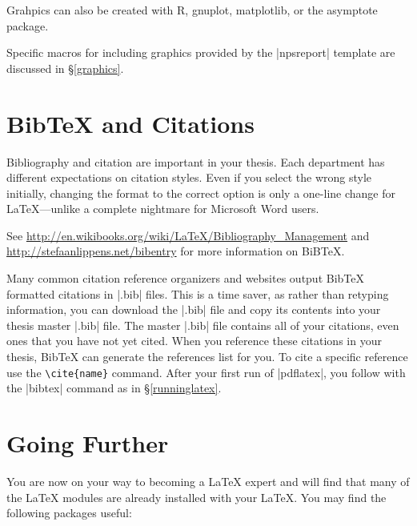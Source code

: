 Grahpics can also be created with R, gnuplot, matplotlib, or the asymptote
package.

Specific macros for including graphics provided by the |npsreport| template are
discussed in \S\ref{graphics}.

\section{Bib\TeX{} and Citations}
Bibliography and citation are important in your thesis.  Each department has different expectations
on citation styles.  Even if you select the wrong style initially, changing the format to the correct
option is only a one-line change for \LaTeX{}---unlike a complete nightmare for Microsoft Word users.

See \url{http://en.wikibooks.org/wiki/LaTeX/Bibliography_Management} and
 \\ \url{http://stefaanlippens.net/bibentry} for more information on BiB\TeX.
 
Many common citation reference organizers and websites output Bib\TeX{}
formatted citations in |.bib| files.  This is a time saver, as rather than
retyping information, you can download the |.bib| file and copy its contents
into your thesis master |.bib| file.  The master |.bib| file contains all of
your citations, even ones that you have not yet cited.  When you reference
these citations in your thesis, Bib\TeX{} can generate the references list for
you.  To cite a specific reference use the \verb|\cite{name}| command.  After
your first run of |pdflatex|, you follow with the |bibtex| command as in
\S\ref{runninglatex}. 

\section{Going Further}

You are now on your way to becoming a \LaTeX{} expert and will find that many
of the \LaTeX{} modules are already installed with your \LaTeX{}.  You may find
the following packages useful:

